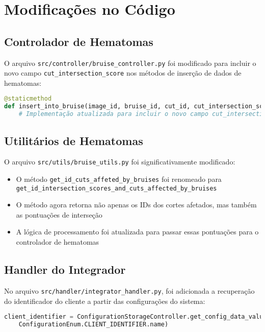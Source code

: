 \documentclass[12pt,a4paper]{article}
\begin{document}
\section{Modificações no Código}

\subsection{Controlador de Hematomas}

O arquivo \texttt{src/controller/bruise\_controller.py} foi modificado para incluir o novo campo \texttt{cut\_intersection\_score} nos métodos de inserção de dados de hematomas:

\begin{lstlisting}[language=Python]
@staticmethod
def insert_into_bruise(image_id, bruise_id, cut_id, cut_intersection_score, bruise_coordinates, region_code_bruise, width=None, height=None, diameter=None, bruise_level_id=None):
    # Implementação atualizada para incluir o novo campo cut_intersection_score
\end{lstlisting}

\subsection{Utilitários de Hematomas}

O arquivo \texttt{src/utils/bruise\_utils.py} foi significativamente modificado:

\begin{itemize}
    \item O método \texttt{get\_id\_cuts\_affeted\_by\_bruises} foi renomeado para \texttt{get\_id\_intersection\_scores\_and\_cuts\_affected\_by\_bruises}
    \item O método agora retorna não apenas os IDs dos cortes afetados, mas também as pontuações de interseção
    \item A lógica de processamento foi atualizada para passar essas pontuações para o controlador de hematomas
\end{itemize}

\subsection{Handler do Integrador}

No arquivo \texttt{src/handler/integrator\_handler.py}, foi adicionada a recuperação do identificador do cliente a partir das configurações do sistema:

\begin{lstlisting}[language=Python]
client_identifier = ConfigurationStorageController.get_config_data_value(
    ConfigurationEnum.CLIENT_IDENTIFIER.name)
\end{lstlisting}
\end{document}
